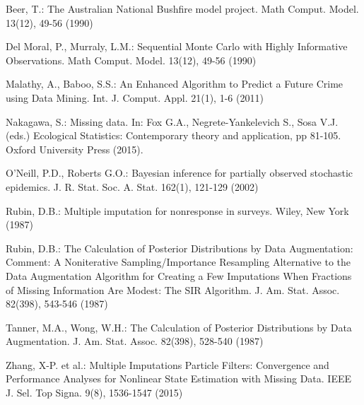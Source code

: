 \begin{thebibliography}{}

Beer, T.: The Australian National Bushfire model project. Math Comput. Model. 13(12), 49-56 (1990)

Del Moral, P., Murraly, L.M.: Sequential Monte Carlo with Highly Informative Observations. Math Comput. Model. 13(12), 49-56 (1990)

Malathy, A., Baboo, S.S.: An Enhanced Algorithm to Predict a Future Crime using Data Mining. Int. J. Comput. Appl. 21(1), 1-6 (2011)

Nakagawa, S.: Missing data. In: Fox G.A., Negrete-Yankelevich S., Sosa V.J. (eds.) Ecological Statistics: Contemporary theory and application, pp 81-105. Oxford University Press (2015). 

O'Neill, P.D., Roberts G.O.: Bayesian inference for partially observed stochastic epidemics. J. R. Stat. Soc. A. Stat. 162(1), 121-129 (2002)

Rubin, D.B.: Multiple imputation for nonresponse in surveys. Wiley, New York (1987)

Rubin, D.B.: The Calculation of Posterior Distributions by Data Augmentation: Comment: A Noniterative Sampling/Importance Resampling Alternative to the Data Augmentation Algorithm for Creating a Few Imputations When Fractions of Missing Information Are Modest: The SIR Algorithm. J. Am. Stat. Assoc. 82(398), 543-546 (1987)

Tanner, M.A., Wong, W.H.: The Calculation of Posterior Distributions by Data Augmentation. J. Am. Stat. Assoc. 82(398), 528-540 (1987)

Zhang, X-P. et al.: Multiple Imputations Particle Filters: Convergence and Performance Analyses for Nonlinear State Estimation with Missing Data. IEEE J. Sel. Top Signa. 9(8), 1536-1547 (2015)

\end{thebibliography}


